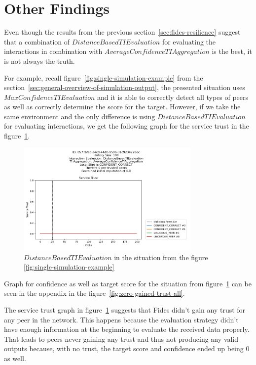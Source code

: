 \section{Other Findings}
\label{sec:other-findings}

Even though the results from the previous section~\ref{sec:fides-resilience} suggest that a combination of $DistanceBasedTIEvaluation$ for evaluating the interactions in combination with $AverageConfidenceTIAggregation$ is the best, it is not always the truth.

For example, recall figure~\ref{fig:single-simulation-example} from the section~\ref{sec:general-overview-of-simulation-output}, the presented situation uses $MaxConfidenceTIEvaluation$ and it is able to correctly detect all types of peers as well as correctly determine the score for the target.
However, if we take the same environment and the only difference is using $DistanceBasedTIEvaluation$ for evaluating interactions, we get the following graph for the service trust in the figure~\ref{fig:zero-gained-trust}.

\begin{figure}[!h]
    \centering
    \includegraphics[width=0.8\textwidth]{assets/zero_gained_trust.png}
    \caption{$DistanceBasedTIEvaluation$ in the situation from the figure \ref{fig:single-simulation-example}}
    \label{fig:zero-gained-trust}
\end{figure}

\noindent
Graph for confidence as well as target score for the situation from figure~\ref{fig:zero-gained-trust} can be seen in the appendix in the figure~\ref{fig:zero-gained-trust-all}.

The service trust graph in figure~\ref{fig:zero-gained-trust} suggests that Fides didn't gain any trust for any peer in the network.
This happens because the evaluation strategy didn't have enough information at the beginning to evaluate the received data properly.
That leads to peers never gaining any trust and thus not producing any valid outputs because, with no trust, the target score and confidence ended up being $0$ as well.